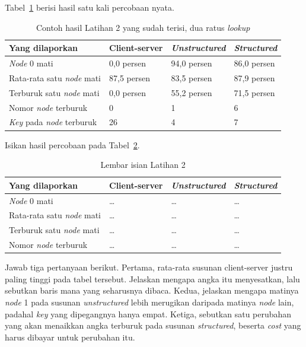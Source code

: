 Tabel~\ref{tab:lat2p2p-contoh} berisi hasil satu kali percobaan nyata.

\begin{table}[htbp]
  \centering
  \caption{Contoh hasil Latihan 2 yang sudah terisi, dua ratus \textit{lookup}}
  \label{tab:lat2p2p-contoh}
  \begin{tabularx}{\textwidth}{|X|l|l|l|}
    \hline
    \textbf{Yang dilaporkan} & \textbf{Client-server} & \textbf{\textit{Unstructured}} & \textbf{\textit{Structured}} \\
    \hline
    \textit{Node} 0 mati & 0,0 persen & 94,0 persen & 86,0 persen \\
    \hline
    Rata-rata satu \textit{node} mati & 87,5 persen & 83,5 persen & 87,9 persen \\
    \hline
    Terburuk satu \textit{node} mati & 0,0 persen & 55,2 persen & 71,5 persen \\
    \hline
    Nomor \textit{node} terburuk & 0 & 1 & 6 \\
    \hline
    \textit{Key} pada \textit{node} terburuk & 26 & 4 & 7 \\
    \hline
  \end{tabularx}
\end{table}

Isikan hasil percobaan pada Tabel~\ref{tab:lat2p2p-hasil}.

\begin{table}[htbp]
  \centering
  \caption{Lembar isian Latihan 2}
  \label{tab:lat2p2p-hasil}
  \begin{tabularx}{\textwidth}{|X|l|l|l|}
    \hline
    \textbf{Yang dilaporkan} & \textbf{Client-server} & \textbf{\textit{Unstructured}} & \textbf{\textit{Structured}} \\
    \hline
    \textit{Node} 0 mati & \dots & \dots & \dots \\
    \hline
    Rata-rata satu \textit{node} mati & \dots & \dots & \dots \\
    \hline
    Terburuk satu \textit{node} mati & \dots & \dots & \dots \\
    \hline
    Nomor \textit{node} terburuk & \dots & \dots & \dots \\
    \hline
  \end{tabularx}
\end{table}

Jawab tiga pertanyaan berikut. Pertama, rata-rata susunan client-server justru
paling tinggi pada tabel tersebut. Jelaskan mengapa angka itu menyesatkan, lalu
sebutkan baris mana yang seharusnya dibaca. Kedua, jelaskan mengapa matinya
\textit{node} 1 pada susunan \textit{unstructured} lebih merugikan daripada matinya \textit{node}
lain, padahal \textit{key} yang dipegangnya hanya empat. Ketiga, sebutkan satu
perubahan yang akan menaikkan angka terburuk pada susunan \textit{structured}, beserta
\textit{cost} yang harus dibayar untuk perubahan itu.


